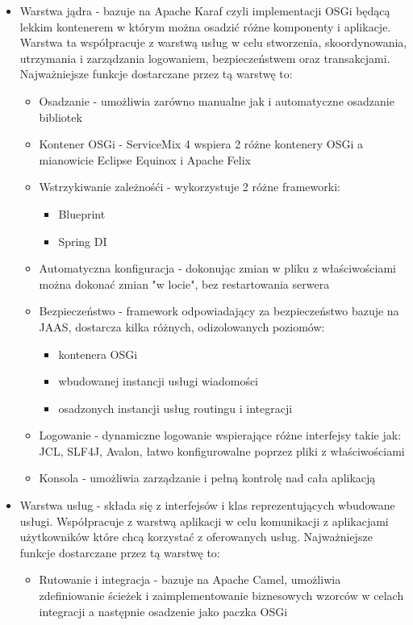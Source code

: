 \begin{itemize}
	\item Warstwa jądra - bazuje na Apache Karaf czyli implementacji OSGi będącą lekkim kontenerem w którym można osadzić różne komponenty i aplikacje. Warstwa ta współpracuje z warstwą usług w celu stworzenia, skoordynowania, utrzymania i zarządzania logowaniem, bezpieczeństwem oraz transakcjami. Najważniejsze funkcje dostarczane przez tą warstwę to:
	\begin{itemize}
		\item Osadzanie - umożliwia zarówno manualne jak i automatyczne osadzanie bibliotek
		\item Kontener OSGi - ServiceMix 4 wspiera 2 różne kontenery OSGi a mianowicie Eclipse Equinox i Apache Felix
		\item Wstrzykiwanie zależnośći - wykorzystuje 2 różne frameworki:
			\begin{itemize}
				\item Blueprint
				\item Spring DI
			\end{itemize}   
		\item Automatyczna konfiguracja - dokonując zmian w pliku z właściwościami można dokonać zmian "w locie", bez restartowania serwera
		\item Bezpieczeństwo - framework odpowiadający za bezpieczeństwo bazuje na JAAS, dostarcza kilka różnych, odizolowanych poziomów:
			\begin{itemize}
				\item kontenera OSGi
				\item wbudowanej instancji usługi wiadomości
				\item osadzonych instancji usług routingu i integracji
			\end{itemize} 
		\item Logowanie - dynamiczne logowanie wspierające różne interfejsy takie jak: JCL, SLF4J, Avalon, łatwo konfigurowalne poprzez pliki z właściwościami
		\item Konsola - umożliwia zarządzanie i pełną kontrolę nad cała aplikacją
	\end{itemize}  
	\item Warstwa usług - 	składa się z interfejsów i klas reprezentujących wbudowane usługi. Współpracuje z warstwą aplikacji w celu komunikacji z aplikacjami użytkowników które chcą korzystać z oferowanych usług. Najważniejsze funkcje dostarczane przez tą warstwę to:
	\begin{itemize}
		\item Rutowanie i integracja - bazuje na Apache Camel, umożliwia zdefiniowanie ścieżek i zaimplementowanie biznesowych wzorców w celach integracji a następnie osadzenie jako paczka OSGi

\end{itemize}
\end{itemize}
